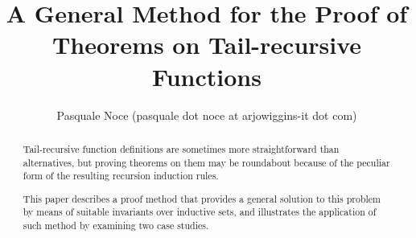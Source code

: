 \documentclass[11pt,a4paper]{article}
\begin{document}
\title{A General Method for the Proof of Theorems on Tail-recursive Functions}
\author{Pasquale Noce (pasquale dot noce at arjowiggins-it dot com)}
\maketitle

\begin{abstract}
  Tail-recursive function definitions are sometimes more straightforward than
  alternatives, but proving theorems on them may be roundabout because of the
  peculiar form of the resulting recursion induction rules.

  This paper describes a proof method that provides a general solution to this
  problem by means of suitable invariants over inductive sets, and illustrates
  the application of such method by examining two case studies.
\end{abstract}

\tableofcontents





\end{document}
